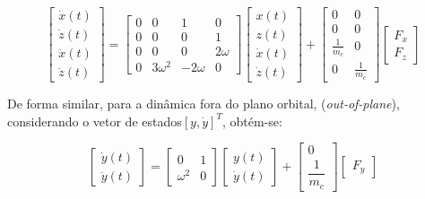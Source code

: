 \begin{equation}
\begin{bmatrix}
\dot{x}(t) \\[0.3em]
\dot{z}(t) \\[0.3em]
\ddot{x}(t) \\[0.3em]
\ddot{z}(t)
\end{bmatrix}
=
\begin{bmatrix}
0 & 0 & 1 & 0 \\
0 & 0 & 0 & 1 \\
0 & 0 & 0 & 2\omega \\
0 & 3\omega^2 & -2\omega & 0
\end{bmatrix}
\begin{bmatrix}
x(t) \\[0.3em]
z(t) \\[0.3em]
\dot{x}(t) \\[0.3em]
\dot{z}(t)
\end{bmatrix}
+
\begin{bmatrix}
0 & 0 \\
0 & 0 \\
\frac{1}{m_c} & 0 \\
0 & \frac{1}{m_c}
\end{bmatrix}
\begin{bmatrix}
F_x \\[0.3em]
F_z
\end{bmatrix}
\label{eq:inplane}
\end{equation}

De forma similar, para a dinâmica fora do plano orbital, (\textit{out-of-plane}), considerando o vetor de estados$[y,\dot{y}]^T$, obtém-se:

\begin{equation}
\begin{bmatrix}
\dot{y}(t) \\[4pt]
\ddot{y}(t)
\end{bmatrix}
=
\begin{bmatrix}
0 & 1 \\[4pt]
\omega^{2} & 0
\end{bmatrix}
\begin{bmatrix}
y(t) \\[4pt]
\dot{y}(t)
\end{bmatrix}
+
\begin{bmatrix}
0 \\[4pt]
\dfrac{1}{m_c}
\end{bmatrix}
\begin{bmatrix}
F_y
\end{bmatrix}
\end{equation}


